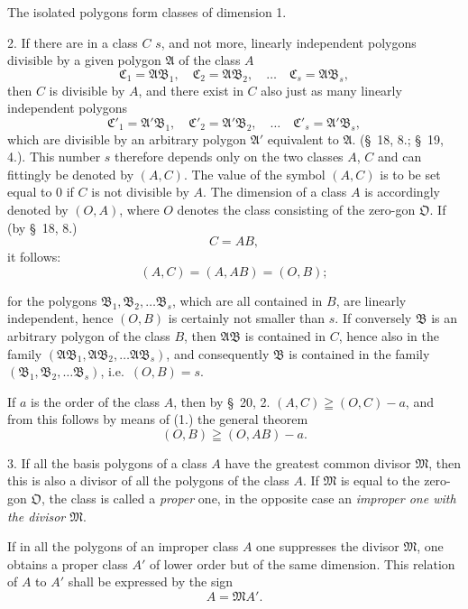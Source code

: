 \documentclass{article}
\begin{document}
The isolated polygons form classes of dimension 1.

2. If there are in a class $C$ $s$, and not more, linearly independent polygons divisible by a given polygon $\mathfrak{A}$ of the class $A$
\[ \mathfrak{C}_{1} = \mathfrak{A}\mathfrak{B}_{1}, \quad \mathfrak{C}_{2} = \mathfrak{A}\mathfrak{B}_{2}, \quad \ldots \quad \mathfrak{C}_{s} = \mathfrak{A}\mathfrak{B}_{s}, \]
then $C$ is divisible by $A$, and there exist in $C$ also just as many linearly independent polygons
\[ \mathfrak{C}'_{1} = \mathfrak{A}'\mathfrak{B}_{1}, \quad \mathfrak{C}'_{2} = \mathfrak{A}'\mathfrak{B}_{2}, \quad \ldots \quad \mathfrak{C}'_{s} = \mathfrak{A}'\mathfrak{B}_{s}, \]
which are divisible by an arbitrary polygon $\mathfrak{A}'$ equivalent to $\mathfrak{A}$. (§~18, 8.; §~19, 4.). This number $s$ therefore depends only on the two classes $A$, $C$ and can fittingly be denoted by $(A, C)$. The value of the symbol $(A, C)$ is to be set equal to 0 if $C$ is not divisible by $A$. The dimension of a class $A$ is accordingly denoted by $(O, A)$, where $O$ denotes the class consisting of the zero-gon $\mathfrak{O}$. If (by §~18, 8.)
\[ C = AB, \]
it follows:
\[ (A, C) = (A, AB) = (O, B); \tag{1.} \]

for the polygons $\mathfrak{B}_{1}, \mathfrak{B}_{2}, \ldots \mathfrak{B}_{s}$, which are all contained in $B$, are linearly independent, hence $(O, B)$ is certainly not smaller than $s$. If conversely $\mathfrak{B}$ is an arbitrary polygon of the class $B$, then $\mathfrak{A}\mathfrak{B}$ is contained in $C$, hence also in the family $(\mathfrak{A}\mathfrak{B}_{1}, \mathfrak{A}\mathfrak{B}_{2}, \ldots \mathfrak{A}\mathfrak{B}_{s})$, and consequently $\mathfrak{B}$ is contained in the family $(\mathfrak{B}_{1}, \mathfrak{B}_{2}, \ldots \mathfrak{B}_{s})$, i.e.\ $(O, B) = s$.

If $a$ is the order of the class $A$, then by §~20, 2. $(A, C) \geqq (O, C) - a$, and from this follows by means of (1.) the general theorem
\[ (O, B) \geqq (O, AB) - a. \tag{2.} \]

3. If all the basis polygons of a class $A$ have the greatest common divisor $\mathfrak{M}$, then this is also a divisor of all the polygons of the class $A$. If $\mathfrak{M}$ is equal to the zero-gon $\mathfrak{O}$, the class is called a \emph{proper} one, in the opposite case an \emph{improper one with the divisor $\mathfrak{M}$}.

If in all the polygons of an improper class $A$ one suppresses the divisor $\mathfrak{M}$, one obtains a proper class $A'$ of lower order but of the same dimension. This relation of $A$ to $A'$ shall be expressed by the sign
\[ A = \mathfrak{M}A'. \]
\end{document}
